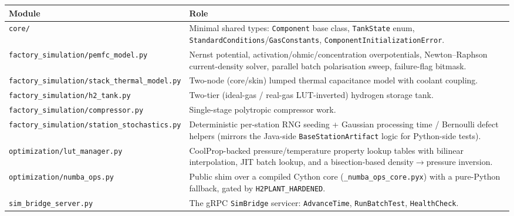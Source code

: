 \documentclass[twocolumn,10pt,a4paper]{article}
\newcommand{\code}[1]{\texttt{\small #1}}
\newcommand{\file}[1]{\texttt{#1}}
\begin{document}
\begin{table}[t]
\centering
\small
\begin{tabular}{@{}p{3.6cm}p{12.9cm}@{}}
\toprule
\textbf{Module} & \textbf{Role} \\
\midrule
\file{core/} & Minimal shared types: \code{Component} base class, \code{TankState} enum, \code{StandardConditions}/\code{GasConstants}, \code{ComponentInitializationError}. \\
\file{factory\_simulation/\allowbreak pemfc\_model.py} & Nernst potential, activation/ohmic/concentration overpotentials, Newton--Raphson current-density solver, parallel batch polarisation sweep, failure-flag bitmask. \\
\file{factory\_simulation/\allowbreak stack\_thermal\_model.py} & Two-node (core/skin) lumped thermal capacitance model with coolant coupling. \\
\file{factory\_simulation/\allowbreak h2\_tank.py} & Two-tier (ideal-gas / real-gas LUT-inverted) hydrogen storage tank. \\
\file{factory\_simulation/\allowbreak compressor.py} & Single-stage polytropic compressor work. \\
\file{factory\_simulation/\allowbreak station\_stochastics.py} & Deterministic per-station RNG seeding + Gaussian processing time / Bernoulli defect helpers (mirrors the Java-side \code{BaseStationArtifact} logic for Python-side tests). \\
\file{optimization/\allowbreak lut\_manager.py} & CoolProp-backed pressure/temperature property lookup tables with bilinear interpolation, JIT batch lookup, and a bisection-based density$\to$pressure inversion. \\
\file{optimization/\allowbreak numba\_ops.py} & Public shim over a compiled Cython core (\file{\_numba\_ops\_core.pyx}) with a pure-Python fallback, gated by \code{H2PLANT\_HARDENED}. \\
\file{sim\_bridge\_server.py} & The gRPC \code{SimBridge} servicer: \code{AdvanceTime}, \code{RunBatchTest}, \code{HealthCheck}. \\
\bottomrule
\end{tabular}
\end{table}
\end{document}
